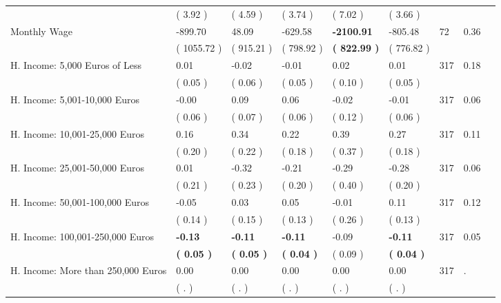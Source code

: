 \begin{tabular}{L{6.2cm} C{1.8cm} C{1.8cm} C{1.8cm} C{1.8cm} C{1.8cm} C{1.8cm} C{0.3cm} C{0.3cm}}
 & (     3.92 ) & (     4.59 ) & (     3.74 ) & (     7.02 ) & (     3.66 )  & \\
Monthly Wage &   -899.70 &     48.09 &   -629.58 & \textbf{ -2100.91} &   -805.48  & 72 &       0.36 \\ 
 & (  1055.72 ) & (   915.21 ) & (   798.92 ) & \textbf{(   822.99 )} & (   776.82 )  & \\
H. Income: 5,000 Euros of Less &      0.01 &     -0.02 &     -0.01 &      0.02 &      0.01  & 317 &       0.18 \\ 
 & (     0.05 ) & (     0.06 ) & (     0.05 ) & (     0.10 ) & (     0.05 )  & \\
H. Income: 5,001-10,000 Euros &     -0.00 &      0.09 &      0.06 &     -0.02 &     -0.01  & 317 &       0.06 \\ 
 & (     0.06 ) & (     0.07 ) & (     0.06 ) & (     0.12 ) & (     0.06 )  & \\
H. Income: 10,001-25,000 Euros &      0.16 &      0.34 &      0.22 &      0.39 &      0.27  & 317 &       0.11 \\ 
 & (     0.20 ) & (     0.22 ) & (     0.18 ) & (     0.37 ) & (     0.18 )  & \\
H. Income: 25,001-50,000 Euros &      0.01 &     -0.32 &     -0.21 &     -0.29 &     -0.28  & 317 &       0.06 \\ 
 & (     0.21 ) & (     0.23 ) & (     0.20 ) & (     0.40 ) & (     0.20 )  & \\
H. Income: 50,001-100,000 Euros &     -0.05 &      0.03 &      0.05 &     -0.01 &      0.11  & 317 &       0.12 \\ 
 & (     0.14 ) & (     0.15 ) & (     0.13 ) & (     0.26 ) & (     0.13 )  & \\
H. Income: 100,001-250,000 Euros & \textbf{    -0.13} & \textbf{    -0.11} & \textbf{    -0.11} &     -0.09 & \textbf{    -0.11}  & 317 &       0.05 \\ 
 & \textbf{(     0.05 )} & \textbf{(     0.05 )} & \textbf{(     0.04 )} & (     0.09 ) & \textbf{(     0.04 )}  & \\
H. Income: More than 250,000 Euros &      0.00 &      0.00 &      0.00 &      0.00 &      0.00  & 317 &          . \\ 
 & (        . ) & (        . ) & (        . ) & (        . ) & (        . )  & \\
\bottomrule
\end{tabular}

